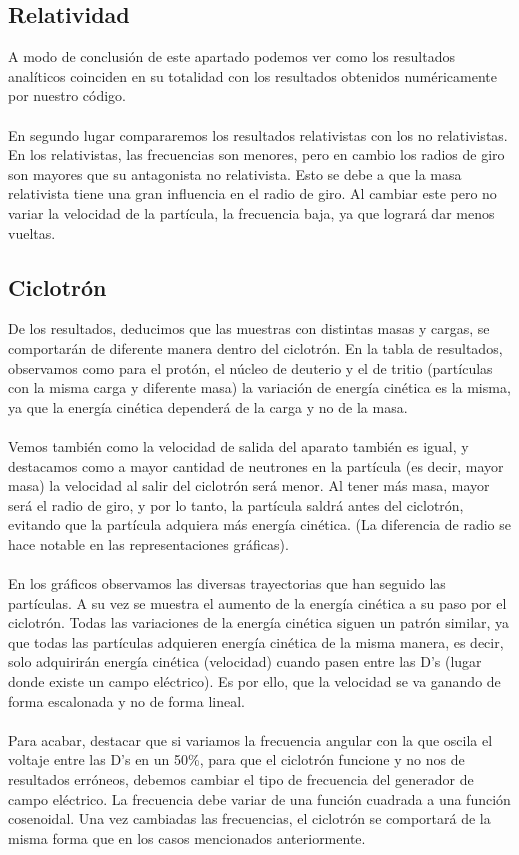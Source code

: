 \documentclass{article}
\begin{document}
\subsection{Relatividad}
\noindent A modo de conclusión de este apartado podemos ver como los resultados analíticos coinciden en su totalidad con los resultados obtenidos numéricamente por nuestro código. \\ \\En segundo lugar compararemos los resultados relativistas con los no relativistas. En los relativistas, las frecuencias son menores, pero en cambio los radios de giro son mayores que su antagonista no relativista. Esto se debe a que la masa relativista tiene una gran influencia en el radio de giro. Al cambiar este pero no variar la velocidad de la partícula, la frecuencia baja, ya que logrará dar menos vueltas.
\vspace{0.5cm}
\subsection{Ciclotrón}
\noindent De los resultados, deducimos que las muestras con distintas masas y cargas, se comportarán de diferente manera dentro del ciclotrón. En la tabla de resultados, observamos como para el protón, el núcleo de deuterio y el de tritio (partículas con la misma carga y
diferente masa) la variación de energía cinética es la misma, ya que la energía cinética dependerá de la carga y no de la masa.\\ \\Vemos también como la velocidad de salida del aparato también es igual, y destacamos como a mayor cantidad de neutrones en la partícula (es decir, mayor masa) la velocidad al salir del ciclotrón será menor. Al tener más masa, mayor será el radio de giro, y por lo tanto, la partícula saldrá antes del ciclotrón, evitando que la partícula adquiera más energía cinética. (La diferencia de radio se hace notable en las representaciones gráficas).\\ \\En los gráficos observamos las diversas trayectorias que han seguido las partículas. A su vez se muestra el aumento de la energía cinética a su paso por el ciclotrón. Todas las variaciones de la energía cinética siguen un patrón similar, ya que todas las partículas adquieren energía cinética de la misma manera, es decir, solo adquirirán energía cinética (velocidad) cuando pasen entre las D’s (lugar donde existe un campo eléctrico). Es por ello, que la velocidad se va ganando de forma escalonada y no de forma lineal.\\ \\Para acabar, destacar que si variamos la frecuencia angular con la que oscila el voltaje entre las D’s en un 50\%, para que el ciclotrón funcione y no nos de resultados erróneos, debemos cambiar el tipo de frecuencia del generador de campo eléctrico. La frecuencia debe variar de una función cuadrada a una función cosenoidal. Una vez cambiadas las frecuencias, el ciclotrón se comportará de la misma forma
que en los casos mencionados anteriormente.
\end{document}

